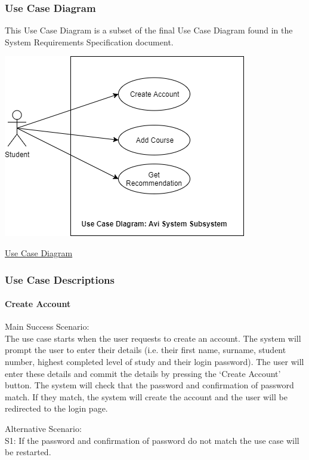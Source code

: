 \documentclass[10pt]{article}
\begin{document}
\subsubsection{Use Case Diagram}
This Use Case Diagram is a subset of the final Use Case Diagram found in the System Requirements Specification document.
\begin{center}
\includegraphics[width=.9\textwidth]{use_case_diagram.png}
\end{center}
\caption{\underline{Use Case Diagram}}

\subsubsection{Use Case Descriptions}

\paragraph{ Create Account \\}

Main Success Scenario: \\
The use case starts when the user requests to create an account. The system will prompt the user to enter their details (i.e. their first name, surname, student number, highest completed level of study and their login password). The user will enter these details and commit the details by pressing the ‘Create Account’ button. The system will check that the password and confirmation of password match. If they match, the system will create the account and the user will be redirected to the login page.

Alternative Scenario: \\
S1: If the password and confirmation of password do not match the use case will be restarted.
\end{document}
